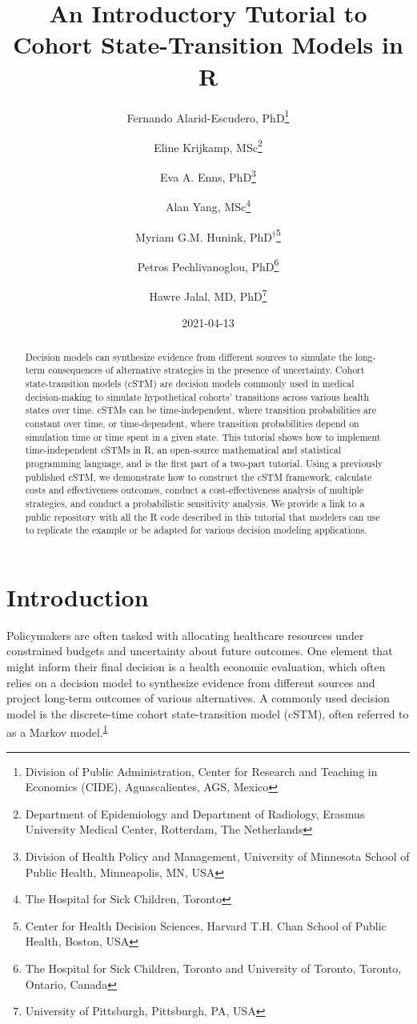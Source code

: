 \documentclass[
]{article}
\title{An Introductory Tutorial to Cohort State-Transition Models in R}
\author{Fernando Alarid-Escudero, PhD\footnote{Division of Public Administration, Center for Research and Teaching in Economics (CIDE), Aguascalientes, AGS, Mexico} \and Eline Krijkamp, MSc\footnote{Department of Epidemiology and Department of Radiology, Erasmus University Medical Center, Rotterdam, The Netherlands} \and Eva A. Enns, PhD\footnote{Division of Health Policy and Management, University of Minnesota School of Public Health, Minneapolis, MN, USA} \and Alan Yang, MSc\footnote{The Hospital for Sick Children, Toronto} \and Myriam G.M. Hunink, PhD\(^\dagger\)\footnote{Center for Health Decision Sciences, Harvard T.H. Chan School of Public Health, Boston, USA} \and Petros Pechlivanoglou, PhD\footnote{The Hospital for Sick Children, Toronto and University of Toronto, Toronto, Ontario, Canada} \and Hawre Jalal, MD, PhD\footnote{University of Pittsburgh, Pittsburgh, PA, USA}}
\date{2021-04-13}
\begin{document}
\maketitle
\begin{abstract}
Decision models can synthesize evidence from different sources to simulate the long-term consequences of alternative strategies in the presence of uncertainty. Cohort state-transition models (cSTM) are decision models commonly used in medical decision-making to simulate hypothetical cohorts' transitions across various health states over time. cSTMs can be time-independent, where transition probabilities are constant over time, or time-dependent, where transition probabilities depend on simulation time or time spent in a given state. This tutorial shows how to implement time-independent cSTMs in R, an open-source mathematical and statistical programming language, and is the first part of a two-part tutorial. Using a previously published cSTM, we demonstrate how to construct the cSTM framework, calculate costs and effectiveness outcomes, conduct a cost-effectiveness analysis of multiple strategies, and conduct a probabilistic sensitivity analysis. We provide a link to a public repository with all the R code described in this tutorial that modelers can use to replicate the example or be adapted for various decision modeling applications.
\end{abstract}

{
\setcounter{tocdepth}{2}
\tableofcontents
}
\hypertarget{introduction}{%
\section{Introduction}\label{introduction}}

Policymakers are often tasked with allocating healthcare resources under constrained budgets and uncertainty about future outcomes. One element that might inform their final decision is a health economic evaluation, which often relies on a decision model to synthesize evidence from different sources and project long-term outcomes of various alternatives. A commonly used decision model is the discrete-time cohort state-transition model (cSTM), often referred to as a Markov model.\textsuperscript{\protect\hyperlink{ref-Kuntz2017}{1}}
\end{document}
